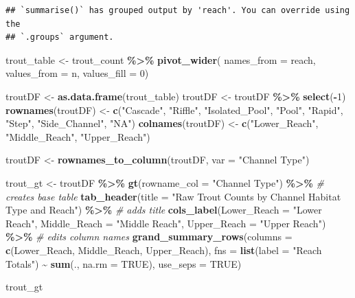 \documentclass[
]{article}
\newenvironment{Shaded}{\begin{snugshade}}{\end{snugshade}}
\newcommand{\AttributeTok}[1]{\textcolor[rgb]{0.13,0.29,0.53}{#1}}
\newcommand{\CommentTok}[1]{\textcolor[rgb]{0.56,0.35,0.01}{\textit{#1}}}
\newcommand{\ConstantTok}[1]{\textcolor[rgb]{0.56,0.35,0.01}{#1}}
\newcommand{\DecValTok}[1]{\textcolor[rgb]{0.00,0.00,0.81}{#1}}
\newcommand{\FunctionTok}[1]{\textcolor[rgb]{0.13,0.29,0.53}{\textbf{#1}}}
\newcommand{\NormalTok}[1]{#1}
\newcommand{\OtherTok}[1]{\textcolor[rgb]{0.56,0.35,0.01}{#1}}
\newcommand{\SpecialCharTok}[1]{\textcolor[rgb]{0.81,0.36,0.00}{\textbf{#1}}}
\newcommand{\StringTok}[1]{\textcolor[rgb]{0.31,0.60,0.02}{#1}}
\begin{document}
\begin{verbatim}
## `summarise()` has grouped output by 'reach'. You can override using the
## `.groups` argument.
\end{verbatim}

\begin{Shaded}
\begin{Highlighting}[]
\NormalTok{trout\_table }\OtherTok{\textless{}{-}}\NormalTok{ trout\_count }\SpecialCharTok{\%\textgreater{}\%}
  \FunctionTok{pivot\_wider}\NormalTok{(}
    \AttributeTok{names\_from =}\NormalTok{ reach,}
    \AttributeTok{values\_from =}\NormalTok{ n,}
    \AttributeTok{values\_fill =} \DecValTok{0}\NormalTok{)}

\NormalTok{troutDF }\OtherTok{\textless{}{-}} \FunctionTok{as.data.frame}\NormalTok{(trout\_table)}
\NormalTok{troutDF }\OtherTok{\textless{}{-}}\NormalTok{ troutDF }\SpecialCharTok{\%\textgreater{}\%} \FunctionTok{select}\NormalTok{(}\SpecialCharTok{{-}}\DecValTok{1}\NormalTok{)}
\FunctionTok{rownames}\NormalTok{(troutDF) }\OtherTok{\textless{}{-}} \FunctionTok{c}\NormalTok{(}\StringTok{"Cascade"}\NormalTok{, }\StringTok{"Riffle"}\NormalTok{, }\StringTok{"Isolated\_Pool"}\NormalTok{, }\StringTok{"Pool"}\NormalTok{, }\StringTok{"Rapid"}\NormalTok{, }\StringTok{"Step"}\NormalTok{, }\StringTok{"Side\_Channel"}\NormalTok{, }\StringTok{"NA"}\NormalTok{)}
\FunctionTok{colnames}\NormalTok{(troutDF) }\OtherTok{\textless{}{-}} \FunctionTok{c}\NormalTok{(}\StringTok{"Lower\_Reach"}\NormalTok{, }\StringTok{"Middle\_Reach"}\NormalTok{, }\StringTok{"Upper\_Reach"}\NormalTok{)}

\NormalTok{troutDF }\OtherTok{\textless{}{-}} \FunctionTok{rownames\_to\_column}\NormalTok{(troutDF, }\AttributeTok{var =} \StringTok{"Channel Type"}\NormalTok{)}

\NormalTok{trout\_gt }\OtherTok{\textless{}{-}}\NormalTok{ troutDF }\SpecialCharTok{\%\textgreater{}\%}
\FunctionTok{gt}\NormalTok{(}\AttributeTok{rowname\_col =} \StringTok{"Channel Type"}\NormalTok{) }\SpecialCharTok{\%\textgreater{}\%} \CommentTok{\# creates base table}
\FunctionTok{tab\_header}\NormalTok{(}\AttributeTok{title =} \StringTok{"Raw Trout Counts by Channel Habitat Type and Reach"}\NormalTok{) }\SpecialCharTok{\%\textgreater{}\%} \CommentTok{\# adds title}
\FunctionTok{cols\_label}\NormalTok{(}\AttributeTok{Lower\_Reach =} \StringTok{"Lower Reach"}\NormalTok{,}
           \AttributeTok{Middle\_Reach =} \StringTok{"Middle Reach"}\NormalTok{,}
           \AttributeTok{Upper\_Reach =} \StringTok{"Upper Reach"}\NormalTok{) }\SpecialCharTok{\%\textgreater{}\%} \CommentTok{\# edits column names}
\FunctionTok{grand\_summary\_rows}\NormalTok{(}\AttributeTok{columns =} \FunctionTok{c}\NormalTok{(Lower\_Reach, Middle\_Reach, Upper\_Reach),}
\AttributeTok{fns =} \FunctionTok{list}\NormalTok{(}\AttributeTok{label =} \StringTok{"Reach Totals"}\NormalTok{) }\SpecialCharTok{\textasciitilde{}} \FunctionTok{sum}\NormalTok{(., }\AttributeTok{na.rm =} \ConstantTok{TRUE}\NormalTok{),}
\AttributeTok{use\_seps =} \ConstantTok{TRUE}\NormalTok{)}

\NormalTok{trout\_gt}
\end{Highlighting}
\end{Shaded}
\end{document}
